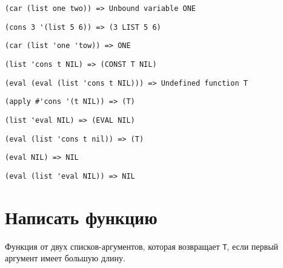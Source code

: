 \begin{lstlisting}
(car (list one two)) => Unbound variable ONE
\end{lstlisting}


\problem \hfill

\begin{lstlisting}
(cons 3 '(list 5 6)) => (3 LIST 5 6)
\end{lstlisting}


\problem \hfill

\begin{lstlisting}
(car (list 'one 'tow)) => ONE
\end{lstlisting}


\problem \hfill

\begin{lstlisting}
(list 'cons t NIL) => (CONST T NIL) 
\end{lstlisting}


\problem \hfill

\begin{lstlisting}
(eval (eval (list 'cons t NIL))) => Undefined function T
\end{lstlisting}


\problem \hfill

\begin{lstlisting}
(apply #'cons '(t NIL)) => (T) 
\end{lstlisting}


\problem \hfill
\begin{lstlisting}
(list 'eval NIL) => (EVAL NIL)
\end{lstlisting}


\problem \hfill
\begin{lstlisting}
(eval (list 'cons t nil)) => (T)
\end{lstlisting}


\problem \hfill
\begin{lstlisting}
(eval NIL) => NIL
\end{lstlisting}


\problem \hfill
\begin{lstlisting}
(eval (list 'eval NIL)) => NIL
\end{lstlisting}



\section{Написать функцию}

\problem Функция от двух списков-аргументов, которая возвращает \verb|T|, если первый аргумент имеет большую длину.


